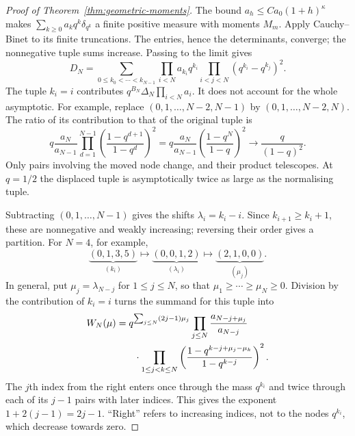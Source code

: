 \documentclass[11pt]{article}
\begin{document}
\begin{proof}[Proof of Theorem~\ref{thm:geometric-moments}]
The bound $a_h\le Ca_0(1+h)^\kappa$ makes
$\sum_{k\ge0}a_kq^k\delta_{q^k}$ a finite positive measure with
moments $M_m$. Apply Cauchy--Binet to its finite truncations.
The entries, hence the determinants, converge; the nonnegative
tuple sums increase. Passing to the limit gives
\begin{equation}\label{eq:heine-geometric}
 D_N=\sum_{0\le k_0<\cdots<k_{N-1}}
 \prod_{i<N}a_{k_i}q^{k_i}
 \prod_{i<j<N}(q^{k_i}-q^{k_j})^2.
\end{equation}
The tuple $k_i=i$ contributes $q^{B_N}\Delta_N\prod_{i<N}a_i$.
It does not account for the whole asymptotic. For example, replace
$(0,1,\ldots,N-2,N-1)$ by $(0,1,\ldots,N-2,N)$. The ratio of
its contribution to that of the original tuple is
\begin{equation}\label{eq:last-node-shift}
 q\frac{a_N}{a_{N-1}}
 \prod_{d=1}^{N-1}\left(\frac{1-q^{d+1}}{1-q^d}\right)^2
 =q\frac{a_N}{a_{N-1}}\left(\frac{1-q^N}{1-q}\right)^2
 \longrightarrow\frac{q}{(1-q)^2}.
\end{equation}
Only pairs involving the moved node change, and their product
telescopes. At $q=1/2$ the displaced tuple is asymptotically twice
as large as the normalising tuple.

Subtracting $(0,1,\ldots,N-1)$ gives the shifts $\lambda_i=k_i-i$.
Since $k_{i+1}\ge k_i+1$, these are nonnegative and weakly increasing;
reversing their order gives a partition. For $N=4$, for example,
\[
 \underbrace{(0,1,3,5)}_{(k_i)}
 \longmapsto\underbrace{(0,0,1,2)}_{(\lambda_i)}
 \longmapsto\underbrace{(2,1,0,0)}_{(\mu_j)}.
\]
In general, put $\mu_j=\lambda_{N-j}$ for $1\le j\le N$, so that
$\mu_1\ge\cdots\ge\mu_N\ge0$. Division by the contribution of
$k_i=i$ turns the summand for this tuple into
\begin{equation}\label{eq:partition-summand}
\begin{split}
 W_N(\mu)={}&q^{\sum_{j\le N}(2j-1)\mu_j}
 \prod_{j\le N}\frac{a_{N-j+\mu_j}}{a_{N-j}}\\
 &\hspace{2mm}\cdot\prod_{1\le j<k\le N}
 \left(\frac{1-q^{k-j+\mu_j-\mu_k}}{1-q^{k-j}}\right)^2.
\end{split}
\end{equation}
The $j$th index from the right enters once through the mass
$q^{k_i}$ and twice through each of its $j-1$ pairs with later
indices. This gives the exponent $1+2(j-1)=2j-1$.
``Right'' refers to increasing indices, not to the nodes $q^{k_i}$,
which decrease towards zero.


\end{proof}
\end{document}
